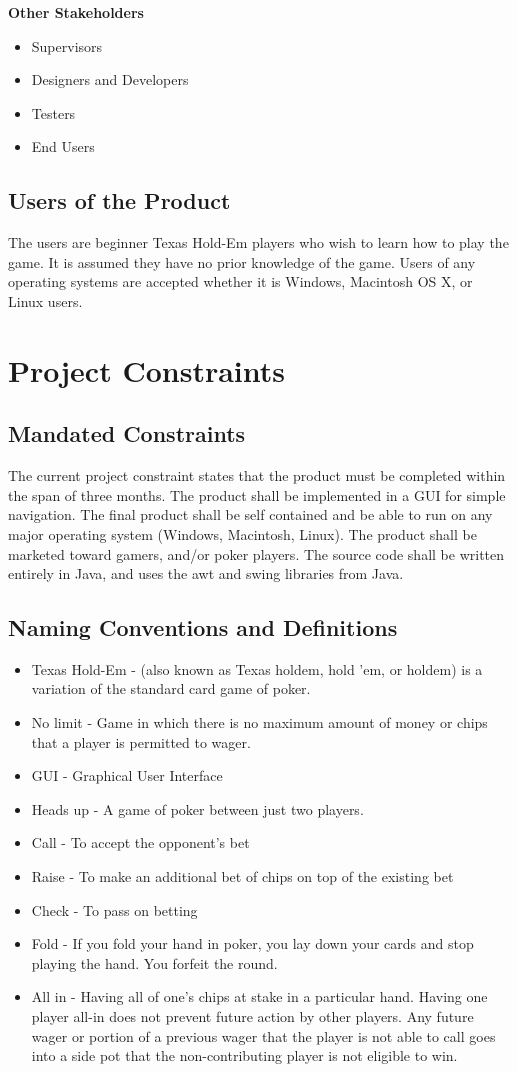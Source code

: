 \documentclass[12pt]{article}
\begin{document}
	\textbf{Other Stakeholders}
	\begin{itemize}
	\item Supervisors
	\item Designers and Developers
	\item Testers
	\item End Users
	\end{itemize}

	\subsection{Users of the Product}
	The users are beginner Texas Hold-Em players who wish to learn how to play the game. It 	is assumed they have no prior knowledge of the game.  Users of any operating systems 		are accepted whether it is Windows, Macintosh OS X, or Linux users. 
	
	\section{Project Constraints}
	\subsection{Mandated Constraints}
	The current project constraint states that the product must be completed within the 		span of three months. The product shall be implemented in a GUI for simple navigation. 		The final product shall be self contained and be able to run on any major operating 		system (Windows, Macintosh, Linux). The product shall be marketed toward gamers, and/or 	poker players. The source code shall be written entirely in Java, and uses the awt and 		swing libraries from Java.
	\subsection{Naming Conventions and Definitions}
	\begin{itemize}
	\item 	Texas Hold-Em -  (also known as Texas holdem, hold 'em, or holdem) is a 					variation of the standard card game of poker.
	\item 	No limit - Game in which there is no maximum amount of money or chips that a 				player is permitted to wager.
	\item	GUI - Graphical User Interface
	\item	Heads up - A game of poker between just two players.
	\item 	Call - To accept the opponent's bet
	\item 	Raise - To make an additional bet of chips on top of the existing bet
	\item 	Check - To pass on betting
	\item	Fold - If you fold your hand in poker, you lay down your cards and stop playing 			the hand. You forfeit the round.
	\item	All in - Having all of one's chips at stake in a particular hand. Having one 				player all-in does not prevent future action by other players. Any future wager 			or portion of a previous wager that the player is not able to call goes into a 				side pot that the non-contributing player is not eligible to win.
	\end{itemize}
\end{document}
